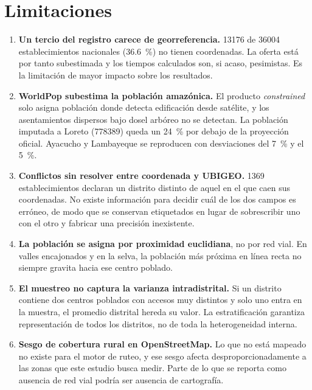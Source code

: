 \documentclass[11pt,a4paper]{article}
\begin{document}
\section{Limitaciones}
\label{sec:limitaciones}

\begin{enumerate}
\item \textbf{Un tercio del registro carece de georreferencia.} \num{13176} de \num{36004}
establecimientos nacionales (\SI{36.6}{\percent}) no tienen coordenadas. La oferta está por
tanto subestimada y los tiempos calculados son, si acaso, pesimistas. Es la limitación de
mayor impacto sobre los resultados.

\item \textbf{WorldPop subestima la población amazónica.} El producto \emph{constrained} solo
asigna población donde detecta edificación desde satélite, y los asentamientos dispersos bajo
dosel arbóreo no se detectan. La población imputada a Loreto (\num{778389}) queda un
\SI{24}{\percent} por debajo de la proyección oficial. Ayacucho y Lambayeque se reproducen con
desviaciones del \SI{7}{\percent} y el \SI{5}{\percent}.

\item \textbf{Conflictos sin resolver entre coordenada y UBIGEO.} \num{1369} establecimientos
declaran un distrito distinto de aquel en el que caen sus coordenadas. No existe información
para decidir cuál de los dos campos es erróneo, de modo que se conservan etiquetados en lugar
de sobrescribir uno con el otro y fabricar una precisión inexistente.

\item \textbf{La población se asigna por proximidad euclidiana}, no por red vial. En valles
encajonados y en la selva, la población más próxima en línea recta no siempre gravita hacia
ese centro poblado.

\item \textbf{El muestreo no captura la varianza intradistrital.} Si un distrito contiene dos
centros poblados con accesos muy distintos y solo uno entra en la muestra, el promedio
distrital hereda su valor. La estratificación garantiza representación de todos los distritos,
no de toda la heterogeneidad interna.

\item \textbf{Sesgo de cobertura rural en OpenStreetMap.} Lo que no está mapeado no existe
para el motor de ruteo, y ese sesgo afecta desproporcionadamente a las zonas que este estudio
busca medir. Parte de lo que se reporta como ausencia de red vial podría ser ausencia de
cartografía.


\end{enumerate}
\end{document}
